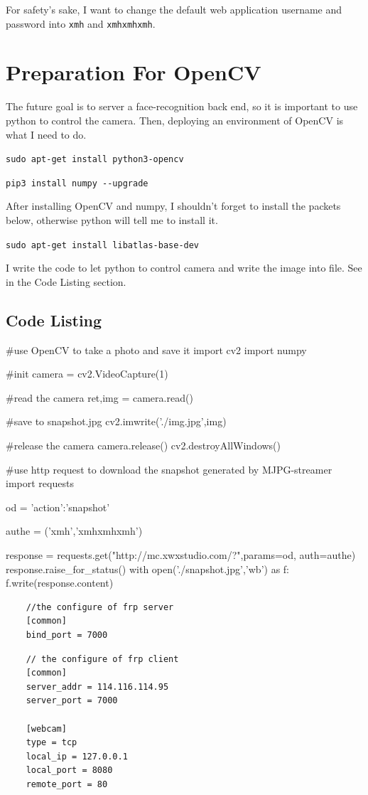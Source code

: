 \documentclass{article}
\begin{document}
For safety's sake, I want to change the default web application username and password into \verb|xmh| and \verb|xmhxmhxmh|.

\section{Preparation For OpenCV}
The future goal is to server a face-recognition back end, so it is important to use python to control the camera. Then, deploying an environment of OpenCV is what I need to do. 

\verb|sudo apt-get install python3-opencv|

\verb|pip3 install numpy --upgrade|

After installing OpenCV and numpy, I shouldn't forget to install the packets below, otherwise python will tell me to install it.

\verb|sudo apt-get install libatlas-base-dev|

I write the code to let python to control camera and write the image into file. See in the Code Listing section.




\begin{appendices}
\section{Code Listing}
\begin{python}
	#use OpenCV to take a photo and save it
	import cv2
	import numpy

	#init
	camera = cv2.VideoCapture(1)

	#read the camera
	ret,img = camera.read()

	#save to snapshot.jpg
	cv2.imwrite('./img.jpg',img)

	#release the camera
	camera.release()
	cv2.destroyAllWindows()
\end{python}
\begin{python}
	#use http request to download the snapshot generated by MJPG-streamer
	import requests

	od = {'action':'snapshot'}

	authe = ('xmh','xmhxmhxmh')

	response = requests.get("http://mc.xwxstudio.com/?",params=od, auth=authe)
	response.raise_for_status()
	with open('./snapshot.jpg','wb') as f:
	    f.write(response.content)
\end{python}
\begin{lstlisting}
	//the configure of frp server
	[common]
	bind_port = 7000
\end{lstlisting}
\begin{lstlisting}
	// the configure of frp client
	[common]
	server_addr = 114.116.114.95
	server_port = 7000

	[webcam]
	type = tcp
	local_ip = 127.0.0.1
	local_port = 8080
	remote_port = 80
\end{lstlisting}
\end{appendices}
\end{document}
